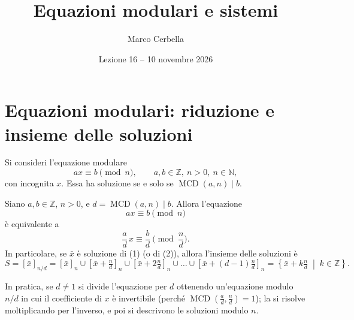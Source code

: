 \documentclass[11pt,a4paper]{article}
\title{Equazioni modulari e sistemi}
\author{Marco Cerbella}
\date{Lezione 16 -- 10 novembre 2026}
\begin{document}
\maketitle

\section{Equazioni modulari: riduzione e insieme delle soluzioni}

Si consideri l'equazione modulare
\[
  ax \equiv b \pmod n, \qquad a, b \in \mathbb{Z},\ n > 0,\ n \in \mathbb{N},
\]
con incognita $x$. Essa ha soluzione se e solo se $\operatorname{MCD}(a, n) \mid b$.

\begin{proposizione}
Siano $a, b \in \mathbb{Z}$, $n > 0$, e $d = \operatorname{MCD}(a, n) \mid b$. Allora l'equazione
\[
  ax \equiv b \pmod n \tag{1}
\]
è equivalente a
\[
  \frac{a}{d}\,x \equiv \frac{b}{d} \pmod{\frac{n}{d}} . \tag{2}
\]
In particolare, se $\bar{x}$ è soluzione di (1) (o di (2)), allora l'insieme delle soluzioni è
\[
  S = \left[\bar{x}\right]_{n/d} = \left[\bar{x}\right]_n \cup \left[\bar{x} + \tfrac{n}{d}\right]_n \cup \left[\bar{x} + 2\tfrac{n}{d}\right]_n \cup \dots \cup \left[\bar{x} + (d-1)\tfrac{n}{d}\right]_n = \left\{\bar{x} + k\tfrac{n}{d} \;\middle|\; k \in \mathbb{Z}\right\}.
\]
\end{proposizione}

In pratica, se $d \neq 1$ si divide l'equazione per $d$ ottenendo un'equazione modulo $n/d$ in cui il coefficiente di $x$ è invertibile (perché $\operatorname{MCD}\!\left(\tfrac{a}{d}, \tfrac{n}{d}\right) = 1$); la si risolve moltiplicando per l'inverso, e poi si descrivono le soluzioni modulo $n$.
\end{document}
